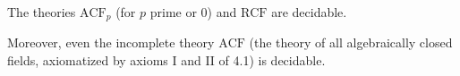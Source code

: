 The theories $\text{ACF}_p$ (for $p$ prime or $0$) and $\text{RCF}$ are decidable.

Moreover, even the incomplete theory $\text{ACF}$ (the theory of all algebraically closed fields, axiomatized by axioms I and II of 4.1) is decidable.
